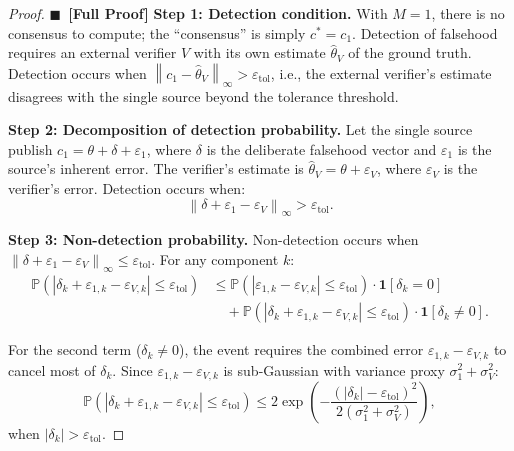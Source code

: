 \documentclass[11pt,a4paper]{article}
\theoremstyle{definition}
\newcommand{\rigorFull}[0]{$\blacksquare$~\textbf{[Full Proof]}}
\newcommand{\Pbb}{\mathbb{P}}
\newcommand{\ind}[1]{\mathbf{1}[#1]}
\newcommand{\norm}[1]{\left\lVert#1\right\rVert}
\newcommand{\abs}[1]{\left|#1\right|}
\begin{document}
\begin{proof}\rigorFull
\textbf{Step 1: Detection condition.} With $M = 1$, there is no consensus to compute; the ``consensus'' is simply $c^* = c_1$. Detection of falsehood requires an external verifier $V$ with its own estimate $\hat{\theta}_V$ of the ground truth. Detection occurs when $\norm{c_1 - \hat{\theta}_V}_\infty > \varepsilon_{\mathrm{tol}}$, i.e., the external verifier's estimate disagrees with the single source beyond the tolerance threshold.

\textbf{Step 2: Decomposition of detection probability.} Let the single source publish $c_1 = \theta + \delta + \varepsilon_1$, where $\delta$ is the deliberate falsehood vector and $\varepsilon_1$ is the source's inherent error. The verifier's estimate is $\hat{\theta}_V = \theta + \varepsilon_V$, where $\varepsilon_V$ is the verifier's error. Detection occurs when:
\begin{equation}
    \norm{\delta + \varepsilon_1 - \varepsilon_V}_\infty > \varepsilon_{\mathrm{tol}}.
    \label{eq:detection_event}
\end{equation}

\textbf{Step 3: Non-detection probability.} Non-detection occurs when $\norm{\delta + \varepsilon_1 - \varepsilon_V}_\infty \leq \varepsilon_{\mathrm{tol}}$. For any component $k$:
\begin{align}
    \Pbb(\abs{\delta_k + \varepsilon_{1,k} - \varepsilon_{V,k}} \leq \varepsilon_{\mathrm{tol}})
    &\leq \Pbb(\abs{\varepsilon_{1,k} - \varepsilon_{V,k}} \leq \varepsilon_{\mathrm{tol}}) \cdot \ind{\delta_k = 0} \\
    &\quad + \Pbb(\abs{\delta_k + \varepsilon_{1,k} - \varepsilon_{V,k}} \leq \varepsilon_{\mathrm{tol}}) \cdot \ind{\delta_k \neq 0}.
    \label{eq:non_detection_decomp}
\end{align}

For the second term ($\delta_k \neq 0$), the event requires the combined error $\varepsilon_{1,k} - \varepsilon_{V,k}$ to cancel most of $\delta_k$. Since $\varepsilon_{1,k} - \varepsilon_{V,k}$ is sub-Gaussian with variance proxy $\sigma_1^2 + \sigma_V^2$:
\begin{equation}
    \Pbb(\abs{\delta_k + \varepsilon_{1,k} - \varepsilon_{V,k}} \leq \varepsilon_{\mathrm{tol}}) \leq 2\exp\left(-\frac{(\abs{\delta_k} - \varepsilon_{\mathrm{tol}})^2}{2(\sigma_1^2 + \sigma_V^2)}\right),
    \label{eq:cancellation_bound}
\end{equation}
when $\abs{\delta_k} > \varepsilon_{\mathrm{tol}}$.


\end{proof}
\end{document}

